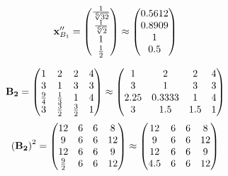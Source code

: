 \documentclass[10pt,a4paper]{article}
\begin{document}
	\[
		\bold{x}''_{B_1} = 
		\begin{pmatrix}
			\frac{1} {\sqrt[6]{32}} \\
			\frac{1} {\sqrt[6]{2}} \\
			{1} {} \\
			\frac{1} {{2}} \\
		\end{pmatrix}
		\approx
		\begin{pmatrix}
			0.5612   \\
			0.8909   \\
			1        \\
			0.5      \\
		\end{pmatrix}
	\]

	\[
		\bold{B_2} = 
		\begin{pmatrix}
			{1} {} & {{2}} {} & {{2}} {} & {{4}} {} \\
			{{3}} {} & {1} {} & {{3}} {} & {{3}} {} \\
			\frac{{9}} {{4}} & \frac{1} {{3}} & {1} {} & {{4}} {} \\
			{{3}} {} & \frac{{3}} {{2}} & \frac{{3}} {{2}} & {1} {} \\
		\end{pmatrix}
		\approx
		\begin{pmatrix}
			1        & 2        & 2        & 4        \\
			3        & 1        & 3        & 3        \\
			2.25     & 0.3333   & 1        & 4        \\
			3        & 1.5      & 1.5      & 1        \\
		\end{pmatrix}
	\]
	\[
		\left(\bold{B_2}\right)^{2} = 
		\begin{pmatrix}
			{{12}} {} & {{6}} {} & {{6}} {} & {{8}} {} \\
			{{9}} {} & {{6}} {} & {{6}} {} & {{12}} {} \\
			{{12}} {} & {{6}} {} & {{6}} {} & {{9}} {} \\
			\frac{{9}} {{2}} & {{6}} {} & {{6}} {} & {{12}} {} \\
		\end{pmatrix}
		\approx
		\begin{pmatrix}
			12       & 6        & 6        & 8        \\
			9        & 6        & 6        & 12       \\
			12       & 6        & 6        & 9        \\
			4.5      & 6        & 6        & 12       \\
		\end{pmatrix}
	\]
\end{document}
